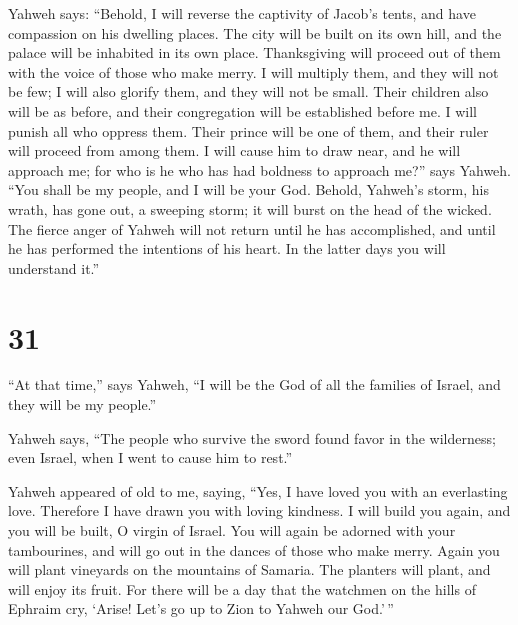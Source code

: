  Yahweh says: ``Behold, I will reverse the captivity of
Jacob's tents, and have compassion on his dwelling places. The city will
be built on its own hill, and the palace will be inhabited in its own
place.  Thanksgiving will proceed out of them with the
voice of those who make merry. I will multiply them, and they will not
be few; I will also glorify them, and they will not be small.
 Their children also will be as before, and their
congregation will be established before me. I will punish all who
oppress them.  Their prince will be one of them, and their
ruler will proceed from among them. I will cause him to draw near, and
he will approach me; for who is he who has had boldness to approach
me?'' says Yahweh.  ``You shall be my people, and I will be
your God.  Behold, Yahweh's storm, his wrath, has gone out,
a sweeping storm; it will burst on the head of the wicked. 
The fierce anger of Yahweh will not return until he has accomplished,
and until he has performed the intentions of his heart. In the latter
days you will understand it.''

\hypertarget{section-30}{%
\section{31}\label{section-30}}

 ``At that time,'' says Yahweh, ``I will be the God of all
the families of Israel, and they will be my people.''

 Yahweh says, ``The people who survive the sword found favor
in the wilderness; even Israel, when I went to cause him to rest.''

 Yahweh appeared of old to me, saying, ``Yes, I have loved
you with an everlasting love. Therefore I have drawn you with loving
kindness.  I will build you again, and you will be built, O
virgin of Israel. You will again be adorned with your tambourines, and
will go out in the dances of those who make merry.  Again
you will plant vineyards on the mountains of Samaria. The planters will
plant, and will enjoy its fruit.  For there will be a day
that the watchmen on the hills of Ephraim cry, `Arise! Let's go up to
Zion to Yahweh our God.'\,''

